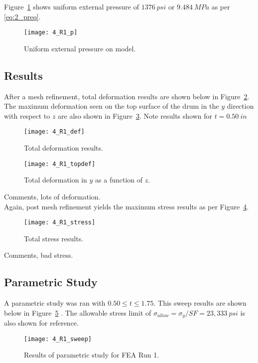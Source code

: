 Figure~\ref{fig:4_R1_p} shows uniform external pressure of $1376\ psi$ or $9.484\  MPa$ as per \ref{eq:2_preq}.
\begin{figure}[H]
	\centering
	\texttt{[image: 4\_R1\_p]}
	\caption{Uniform external pressure on model.}
	\label{fig:4_R1_p}
\end{figure}

\subsection{Results}

After a mesh refinement, total deformation results are shown below in Figure~\ref{fig:4_R1_def}. The maximum deformation seen on the top surface of the drum in the $y$ direction with respect to $z$ are also shown in Figure~\ref{fig:4_R1_topdef}. Note results shown for $t=0.50\ in$

\begin{figure}[H]
	\centering
	\texttt{[image: 4\_R1\_def]}
	\caption{Total deformation results.}
	\label{fig:4_R1_def}
\end{figure}
\begin{figure}[H]
	\centering
	\texttt{[image: 4\_R1\_topdef]}
	\caption{Total deformation in $y$ as a function of $z$.}
	\label{fig:4_R1_topdef}
\end{figure}

Comments, lots of deformation.\\

Again, post mesh refinement yields the maximum stress results as per Figure~\ref{fig:4_R1_stress}.

\begin{figure}[H]
	\centering
	\texttt{[image: 4\_R1\_stress]}
	\caption{Total stress results.}
	\label{fig:4_R1_stress}
\end{figure}

Comments, bad stress.


\subsection{Parametric Study}

A parametric study was ran with $0.50 \leq t \leq 1.75$. This sweep results are shown below in Figure~\ref{fig:4_R1_sweep} \cite{EXCEL}. The allowable stress limit of $\sigma_{allow}=\sigma_{y}/SF = 23,333\ psi$ is also shown for reference.

\begin{figure}[H]
	\centering
	\texttt{[image: 4\_R1\_sweep]}
	\caption{Results of parametric study for FEA Run 1.}
	\label{fig:4_R1_sweep}
\end{figure}

